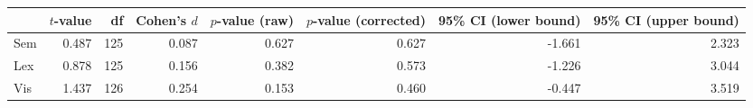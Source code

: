\begin{tabular}{lrrrrrrr}
\toprule
{} & $t$-value &  df & Cohen's $d$ & $p$-value (raw) & $p$-value (corrected) & 95\% CI (lower bound) & 95\% CI (upper bound) \\
\midrule
Sem &     0.487 & 125 &       0.087 &           0.627 &                 0.627 &                -1.661 &                 2.323 \\
Lex &     0.878 & 125 &       0.156 &           0.382 &                 0.573 &                -1.226 &                 3.044 \\
Vis &     1.437 & 126 &       0.254 &           0.153 &                 0.460 &                -0.447 &                 3.519 \\
\bottomrule
\end{tabular}
